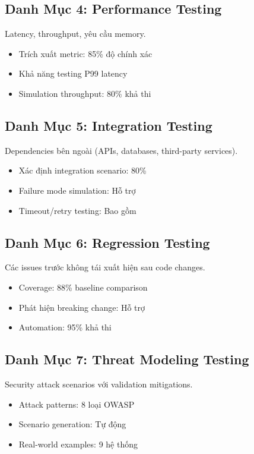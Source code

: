 \documentclass[12pt,oneside]{report}
\begin{document}
\subsection{Danh Mục 4: Performance Testing}
Latency, throughput, yêu cầu memory.
\begin{itemize}
    \item Trích xuất metric: 85\% độ chính xác
    \item Khả năng testing P99 latency
    \item Simulation throughput: 80\% khả thi
\end{itemize}

\subsection{Danh Mục 5: Integration Testing}
Dependencies bên ngoài (APIs, databases, third-party services).
\begin{itemize}
    \item Xác định integration scenario: 80\%
    \item Failure mode simulation: Hỗ trợ
    \item Timeout/retry testing: Bao gồm
\end{itemize}

\subsection{Danh Mục 6: Regression Testing}
Các issues trước không tái xuất hiện sau code changes.
\begin{itemize}
    \item Coverage: 88\% baseline comparison
    \item Phát hiện breaking change: Hỗ trợ
    \item Automation: 95\% khả thi
\end{itemize}

\subsection{Danh Mục 7: Threat Modeling Testing}
Security attack scenarios với validation mitigations.
\begin{itemize}
    \item Attack patterns: 8 loại OWASP
    \item Scenario generation: Tự động
    \item Real-world examples: 9 hệ thống
\end{itemize}
\end{document}
